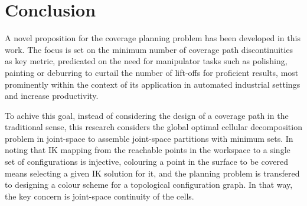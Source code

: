 \documentclass[journal]{IEEEtran}
\begin{document}
\section{Conclusion}
\label{sectionconclusion}

A novel proposition for the coverage planning problem has been developed in this work. 
The focus is set on the minimum
number of coverage path discontinuities as key metric, predicated on the need for manipulator tasks such as polishing, painting or deburring to curtail the number of lift-offs for proficient results, most prominently within the context of its application in automated industrial settings and increase productivity.

To achive this goal, instead of considering the design of a coverage path in the traditional sense, this research considers the global optimal cellular decomposition problem in joint-space to assemble joint-space partitions with minimum sets. 
In noting that IK mapping from the reachable points in the workspace to a single set of configurations is injective, 
colouring a point in the surface to be covered means selecting a given IK solution for it, and the planning problem is transfered to designing a colour scheme for a topological configuration graph. In that way, the key concern is joint-space continuity of the cells. 
\end{document}

